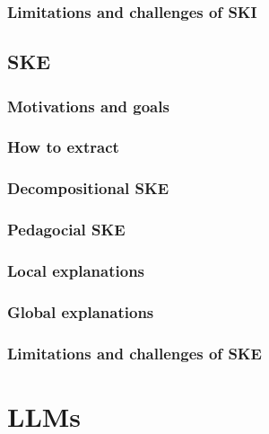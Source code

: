 \documentclass[12pt,a4paper,openright,twoside]{book}
\begin{document}
\subsection{Limitations and challenges of \ac{SKI}}\label{subsec:limitations-and-challenges-of-ski}

\section{\Acl{SKE}}\label{sec:ske}

\subsection{Motivations and goals}\label{subsec:ske-motivations-and-goals}

\subsection{How to extract}\label{subsec:how-to-extract}

\subsection{Decompositional \ac{SKE}}\label{subsec:decompositional-ske}

\subsection{Pedagocial \ac{SKE}}\label{subsec:pedagogical-ske}

\subsection{Local explanations}\label{subsec:local-explanations}

\subsection{Global explanations}\label{subsec:global-explanations}

\subsection{Limitations and challenges of \ac{SKE}}\label{subsec:limitations-and-challenges-of-ske}


\chapter{\Aclp{LLM}}\label{ch:llm}
\end{document}
